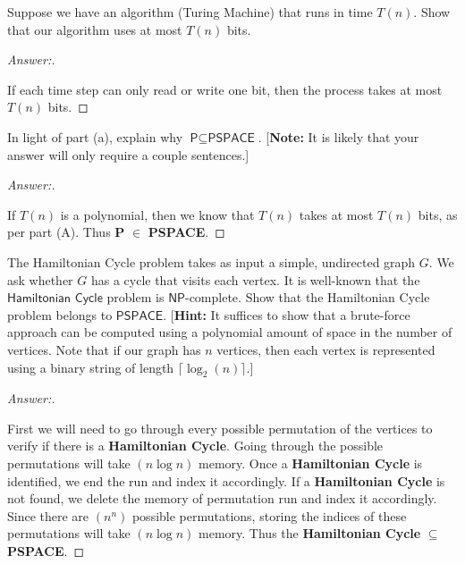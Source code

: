\documentclass[11pt]{article}
\theoremstyle{definition}
\theoremstyle{definition}
\theoremstyle{definition}
\begin{document}
\begin{enumerate}[label=(\alph*)]
\item Suppose we have an algorithm (Turing Machine) that runs in time $T(n)$. Show that our algorithm uses at most $T(n)$ bits.

\begin{proof}[Answer:] \
\item If each time step can only read or write one bit, then the process takes at most $T(n)$ bits.
\end{proof}


\vskip 15pt
\item In light of part (a), explain why $\textsf{P} \subseteq \textsf{PSPACE}$. [\textbf{Note:} It is likely that your answer will only require a couple sentences.]

\begin{proof}[Answer:] \
\item If $T(n)$ is a polynomial, then we know that $T(n)$ takes at most $T(n)$ bits, as per part (A). Thus \textbf{P} $\in$ \textbf{PSPACE}.
\end{proof}



\vskip 15pt
\item The \textsf{Hamiltonian Cycle} problem takes as input a simple, undirected graph $G$. We ask whether $G$ has a cycle that visits each vertex. It is well-known that the $\textsf{Hamiltonian Cycle}$ problem is $\textsf{NP}$-complete. Show that the \textsf{Hamiltonian Cycle} problem belongs to $\textsf{PSPACE}$. [\textbf{Hint:} It suffices to show that a brute-force approach can be computed using a polynomial amount of space in the number of vertices. Note that if our graph has $n$ vertices, then each vertex is represented using a binary string of length $\lceil \log_{2}(n) \rceil$.]

\begin{proof}[Answer:] \
\item First we will need to go through every possible permutation of the vertices to verify if there is a \textbf{Hamiltonian Cycle}. Going through the possible permutations will take $(n \log n)$ memory. Once a \textbf{Hamiltonian Cycle} is identified, we end the run and index it accordingly. If a \textbf{Hamiltonian Cycle} is not found, we delete the memory of permutation run and index it accordingly. Since there are $(n^{n})$ possible permutations, storing the indices of these permutations will take $(n \log n)$ memory. Thus the \textbf{Hamiltonian Cycle} $\subseteq$ \textbf{PSPACE}.
\end{proof}





\end{enumerate}
\end{document}
